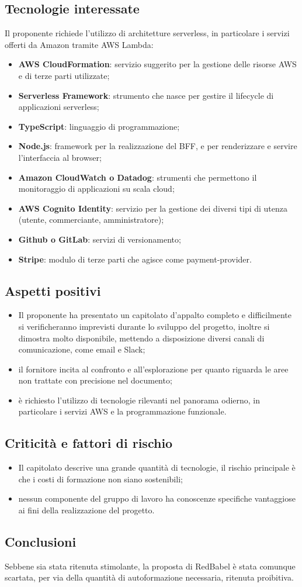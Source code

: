 \subsection{Tecnologie interessate}
Il proponente richiede l'utilizzo di architetture serverless, in particolare i servizi offerti da Amazon tramite AWS Lambda:
\begin{itemize}
	\item \textbf{AWS CloudFormation}: servizio suggerito per la gestione delle risorse AWS e di terze parti utilizzate;
  \item \textbf{Serverless Framework}: strumento che nasce per gestire il lifecycle di applicazioni serverless;
	\item \textbf{TypeScript}: linguaggio di programmazione;
	\item \textbf{Node.js}: framework per la realizzazione del BFF, e per renderizzare e servire l'interfaccia al browser;
	\item \textbf{Amazon CloudWatch o Datadog}: strumenti che permettono il monitoraggio di applicazioni su scala cloud;
	\item \textbf{AWS Cognito Identity}: servizio per la gestione dei diversi tipi di utenza (utente, commerciante, amministratore);
	\item \textbf{Github o GitLab}: servizi di versionamento;
	\item \textbf{Stripe}: modulo di terze parti che agisce come payment-provider.
\end{itemize}
\subsection{Aspetti positivi}
\begin{itemize}
    \item Il proponente ha presentato un capitolato d'appalto completo e difficilmente si verificheranno imprevisti durante lo sviluppo del progetto, inoltre si dimostra molto disponibile, mettendo a disposizione diversi canali di comunicazione, come email e Slack;
    \item il fornitore incita al confronto e all'esplorazione per quanto riguarda le aree non trattate con precisione nel documento;
    \item è richiesto l'utilizzo di tecnologie rilevanti nel panorama odierno, in particolare i servizi AWS e la programmazione funzionale.
\end{itemize}
\subsection{Criticità e fattori di rischio}
\begin{itemize}
    \item Il capitolato descrive una grande quantità di tecnologie, il rischio principale è che i costi di formazione non siano sostenibili;
    \item nessun componente del gruppo di lavoro ha conoscenze specifiche vantaggiose ai fini della realizzazione del progetto.
\end{itemize}
\subsection{Conclusioni}
Sebbene sia stata ritenuta stimolante, la proposta di RedBabel è stata comunque scartata, per via della quantità di autoformazione necessaria, ritenuta proibitiva.